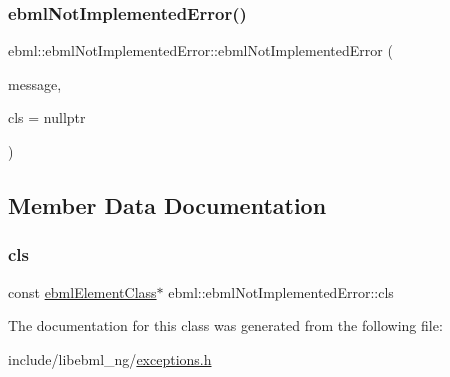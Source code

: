 \subsubsection{\texorpdfstring{ebml\+Not\+Implemented\+Error()}{ebmlNotImplementedError()}}
{\footnotesize\ttfamily ebml\+::ebml\+Not\+Implemented\+Error\+::ebml\+Not\+Implemented\+Error (\begin{DoxyParamCaption}\item[{const std\+::string \&}]{message,  }\item[{const \mbox{\hyperlink{classebml_1_1ebmlElementClass}{ebml\+Element\+Class}} $\ast$}]{cls = {\ttfamily nullptr} }\end{DoxyParamCaption})}



\subsection{Member Data Documentation}
\mbox{\label{classebml_1_1ebmlNotImplementedError_affef6ae492f6c0ab0c22970955a2e8c9}} 
\subsubsection{\texorpdfstring{cls}{cls}}
{\footnotesize\ttfamily const \mbox{\hyperlink{classebml_1_1ebmlElementClass}{ebml\+Element\+Class}}$\ast$ ebml\+::ebml\+Not\+Implemented\+Error\+::cls}



The documentation for this class was generated from the following file\+:\begin{DoxyCompactItemize}
\item 
include/libebml\+\_\+ng/\mbox{\hyperlink{exceptions_8h}{exceptions.\+h}}\end{DoxyCompactItemize}
